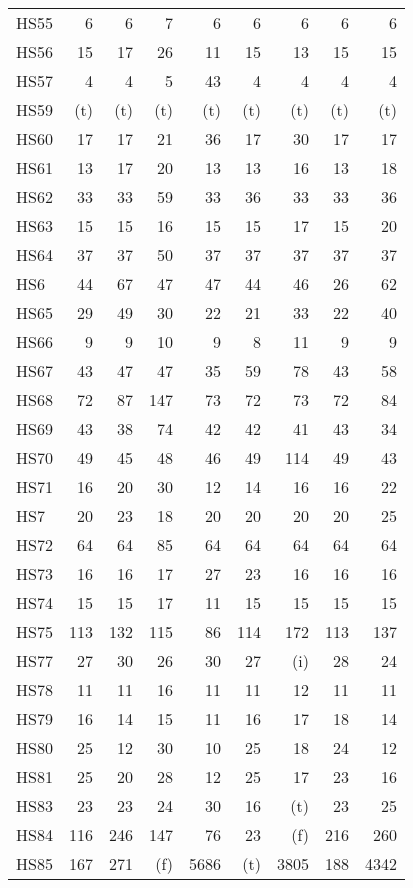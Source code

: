 \documentclass[11pt,twoside]{article}
\begin{document}
{\begin{longtable}[c]{|l|r|r|r|r|r|r|r|r|}
 HS55 & 6 & 6 & 7 & 6 & 6 & 6 & 6 & 6 \\
 HS56 & 15 & 17 & 26 & 11 & 15 & 13 & 15 & 15 \\
 HS57 & 4 & 4 & 5 & 43 & 4 & 4 & 4 & 4 \\
 HS59 & (t) & (t) & (t) & (t) & (t) & (t) & (t) & (t) \\
 HS60 & 17 & 17 & 21 & 36 & 17 & 30 & 17 & 17 \\
 HS61 & 13 & 17 & 20 & 13 & 13 & 16 & 13 & 18 \\
 HS62 & 33 & 33 & 59 & 33 & 36 & 33 & 33 & 36 \\
 HS63 & 15 & 15 & 16 & 15 & 15 & 17 & 15 & 20 \\
 HS64 & 37 & 37 & 50 & 37 & 37 & 37 & 37 & 37 \\
 HS6 & 44 & 67 & 47 & 47 & 44 & 46 & 26 & 62 \\
 HS65 & 29 & 49 & 30 & 22 & 21 & 33 & 22 & 40 \\
 HS66 & 9 & 9 & 10 & 9 & 8 & 11 & 9 & 9 \\
 HS67 & 43 & 47 & 47 & 35 & 59 & 78 & 43 & 58 \\
 HS68 & 72 & 87 & 147 & 73 & 72 & 73 & 72 & 84 \\
 HS69 & 43 & 38 & 74 & 42 & 42 & 41 & 43 & 34 \\
 HS70 & 49 & 45 & 48 & 46 & 49 & 114 & 49 & 43 \\
 HS71 & 16 & 20 & 30 & 12 & 14 & 16 & 16 & 22 \\
 HS7 & 20 & 23 & 18 & 20 & 20 & 20 & 20 & 25 \\
 HS72 & 64 & 64 & 85 & 64 & 64 & 64 & 64 & 64 \\
 HS73 & 16 & 16 & 17 & 27 & 23 & 16 & 16 & 16 \\
 HS74 & 15 & 15 & 17 & 11 & 15 & 15 & 15 & 15 \\
 HS75 & 113 & 132 & 115 & 86 & 114 & 172 & 113 & 137 \\
 HS77 & 27 & 30 & 26 & 30 & 27 & (i) & 28 & 24 \\
 HS78 & 11 & 11 & 16 & 11 & 11 & 12 & 11 & 11 \\
 HS79 & 16 & 14 & 15 & 11 & 16 & 17 & 18 & 14 \\
 HS80 & 25 & 12 & 30 & 10 & 25 & 18 & 24 & 12 \\
 HS81 & 25 & 20 & 28 & 12 & 25 & 17 & 23 & 16 \\
 HS83 & 23 & 23 & 24 & 30 & 16 & (t) & 23 & 25 \\
 HS84 & 116 & 246 & 147 & 76 & 23 & (f) & 216 & 260 \\
 HS85 & 167 & 271 & (f) & 5686 & (t) & 3805 & 188 & 4342 \\

\end{longtable}}
\end{document}

